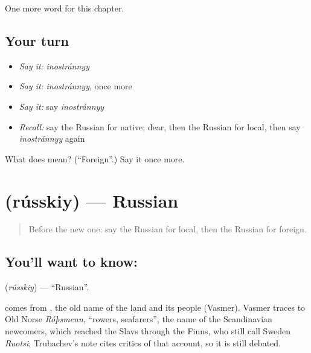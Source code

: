 \begin{grammarlens}[title={What you've built}]
One more word for this chapter.
\end{grammarlens}

\subsection*{Your turn}
\begin{itemize}
\raggedright
  \item \emph{Say it:} \emph{inostránnyy}
  \item \emph{Say it:} \emph{inostránnyy}, once more
  \item \emph{Say it:} say \emph{inostránnyy}
  \item \emph{Recall:} say the Russian for native; dear, then the Russian for local, then say \emph{inostránnyy} again
\end{itemize}

\begin{tcolorbox}[breakable,colback=teal!4,colframe=teal!35!black,title={Before you move on}]
What does  mean? (\textquotedblleft{}Foreign\textquotedblright{}.) Say it once more.
\end{tcolorbox}
\section[\texorpdfstring{\ru{русский} (rússkiy)}{русский (rússkiy)}]{ (rússkiy) — Russian}

\label{lesson:RU-C189-russkiy}



\begin{quote}
Before the new one: say the Russian for local, then the Russian for foreign.
\end{quote}

\subsection*{You'll want to know: }
\textbf{} (\emph{rússkiy}) — \textquotedblleft{}Russian\textquotedblright{}.

\begin{cousinweb}
\textbf{} comes from \emph{}, the old name of the land and its people (Vasmer). Vasmer traces \emph{} to Old Norse \emph{Róþsmenn}, \textquotedblleft{}rowers, seafarers\textquotedblright{}, the name of the Scandinavian newcomers, which reached the Slavs through the Finns, who still call Sweden \emph{Ruotsi}; Trubachev's note cites critics of that account, so it is still debated.
\end{cousinweb}

